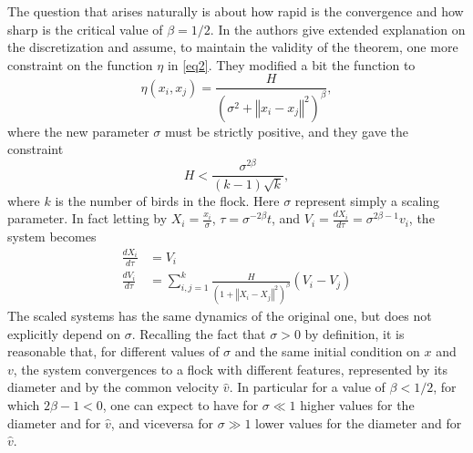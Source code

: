 \documentclass{article} %
\begin{document}
The question that
arises naturally is about how rapid is the convergence and how sharp is the critical value of $\beta=1/2$.
In \cite{CuckerSmale1} the authors give extended explanation on the 
discretization and assume, to maintain the validity of the theorem, one more constraint on
the function $\eta$ in \eqref{eq2}. They modified a bit the function to 
\begin{equation}
	\label{eq9}
	\eta(x_i,x_j)=\frac{H}{(\sigma^2+\left\Vert x_i - x_j \right\Vert^2)^{\beta}},
\end{equation}
where the new parameter $\sigma$ must be strictly positive, and they gave the constraint
\begin{equation}
	\label{eq10}
	H<\frac{\sigma^{2\beta}}{(k-1)\sqrt{k}},
\end{equation}
where $k$ is the number of birds in the flock.
Here $\sigma$ represent simply a scaling parameter. In fact letting by $X_i=\frac{x_i}{\sigma}$,
$\tau=\sigma^{-2\beta}t$, and $V_i=\frac{dX_i}{d\tau}=\sigma^{2\beta-1}v_i$,  the system becomes
\begin{align}
\label{eq11}
    \frac{dX_i}{d\tau} &= V_i\\
    \frac{dV_i}{d\tau} &= \sum_{i,j=1}^k\frac{H}{(1+\left\Vert X_i - X_j \right\Vert^2)^{\beta}}(V_i - V_j)\nonumber
\end{align}
The scaled systems has the same dynamics of the original one, but does not explicitly depend on $\sigma$.
Recalling the fact that $\sigma>0$ by definition, it is reasonable that, for different values of $\sigma$
and the same initial condition on $x$ and $v$, the system convergences to a flock with different features,
represented by its diameter and by the common velocity $\widehat{v}$. In particular for a value of $\beta<1/2$,
for which $2\beta-1<0$, one can expect to have for $\sigma\ll1$ higher values for the diameter and for $\widehat{v}$,
and viceversa for $\sigma\gg1$ lower values for the diameter and for $\widehat{v}$.


\end{document}

